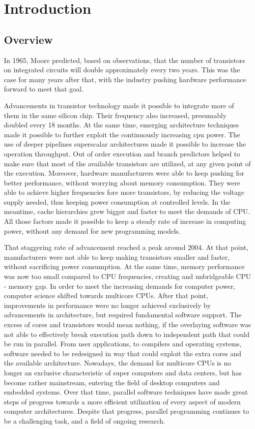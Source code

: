 \def\<#1>{\textit{#1}}


\chapter{Introduction}
\section{Overview}

In 1965, Moore predicted, based on observations, that the number of transistors on integrated circuits will double approximately every two years. This was the case for many years after that, with the industry pushing hardware performance forward to meet that goal. 

Advancements in transistor technology made it possible to integrate more of them in the same silicon chip. Their frequency also increased, presumably doubled every 18 months. At the same time, emerging architecture techniques made it possible to further exploit the continuously increasing cpu power. The use of deeper pipelines superscalar architectures made it possible to increase the operation throughput. Out of order execution and branch predictors helped to make sure that most of the available transistors are utilized, at any given point of the execution. Moreover, hardware manufacturers were able to keep pushing for better performance, without worrying about memory consumption. They were able to achieve higher frequencies fore more transistors, by reducing the voltage supply needed, thus keeping power consumption at controlled levels. In the meantime, cache hierarchies  grew bigger and faster to meet the demands of CPU. All those factors made it possible to keep a steady rate of increase in computing power, without any demand for new programming models.

That staggering rate of advancement reached a peak around 2004. At that point, manufacturers were not able to keep making transistors smaller and faster, without sacrificing power consumption. At the same time, memory performance was now too small compared to CPU frequencies, creating and unbridgeable CPU -  memory gap. In order to meet the increasing demands for computer power, computer science shifted towards multicore CPUs. After that point, improvements in performance were no longer achieved exclusively by advancements in architecture, but required fundamental software support. The excess of cores and transistors would mean nothing, if the overlaying software was not able to effectively break execution path down to independent path that could be run in parallel. From user applications, to compilers and operating systems, software needed to be redesigned in way that could exploit the extra cores and the available architecture. Nowadays, the demand for multicore CPUs is no longer an exclusive characteristic of super computers and data centers, but has become rather mainstream, entering the field of desktop computers and embedded systems. Over that time, parallel software techniques have made great steps of progress towards a more efficient utilization of every aspect of modern computer architectures. Despite that progress, parallel programming continues to be a challenging task, and a field of ongoing research.

